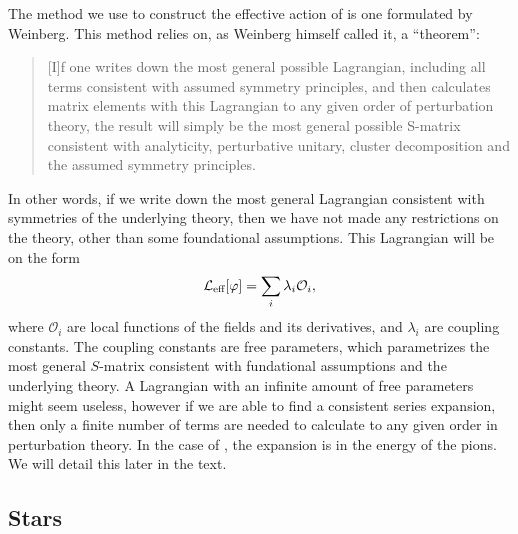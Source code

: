 The method we use to construct the effective action of \chpt is one formulated by Weinberg.
This method relies on, as Weinberg himself called it, a ``theorem'':
\begin{quote}
    [I]f one writes down the most general possible Lagrangian, including all terms consistent with assumed symmetry principles, and then calculates matrix elements with this Lagrangian to any given order of perturbation theory, the result will simply be the most general possible S-matrix consistent with analyticity, perturbative unitary, cluster decomposition and the assumed symmetry principles. \cite{WeinbergPhenom}
\end{quote}
In other words, if we write down the most general Lagrangian consistent with symmetries of the underlying theory, then we have not made any restrictions on the theory, other than some foundational assumptions.
This Lagrangian will be on the form
\begin{equation}
    \mathcal{L}_\text{eff}[\varphi] = \sum_i \lambda_i \mathcal O_i,
\end{equation}
where $\mathcal O_i$ are local functions of the fields and its derivatives, and $\lambda_i$ are coupling constants.
The coupling constants are free parameters, which parametrizes the most general $S$-matrix consistent with fundational assumptions and the underlying theory.
A Lagrangian with an infinite amount of free parameters might seem useless, however if we are able to find a consistent series expansion, then only a finite number of terms are needed to calculate to any given order in perturbation theory.
In the case of \chpt, the expansion is in the energy of the pions.
We will detail this later in the text.


\subsection*{Stars}

